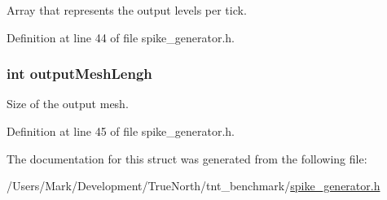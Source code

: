 Array that represents the output levels per tick. 



Definition at line 44 of file spike\+\_\+generator.\+h.

\hypertarget{structselected_spikes_a97727a3be0dbd5813f860c99733048a8}{}
\subsubsection[{output\+Mesh\+Lengh}]{\setlength{\rightskip}{0pt plus 5cm}int output\+Mesh\+Lengh}\label{structselected_spikes_a97727a3be0dbd5813f860c99733048a8}


Size of the output mesh. 



Definition at line 45 of file spike\+\_\+generator.\+h.



The documentation for this struct was generated from the following file\+:\begin{DoxyCompactItemize}
\item 
/\+Users/\+Mark/\+Development/\+True\+North/tnt\+\_\+benchmark/\hyperlink{spike__generator_8h}{spike\+\_\+generator.\+h}\end{DoxyCompactItemize}
